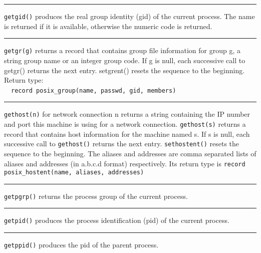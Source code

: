 \bigskip\hrule\vspace{0.1cm}

\noindent
\texttt{getgid()} produces the real group identity (gid) of the current process.
The name is returned if it is available, otherwise the numeric code is
returned.

\bigskip\hrule\vspace{0.1cm}

\noindent
\texttt{getgr(g)} returns a record that contains group file
information for group
g, a string group name or an integer group code. If g is null, each
successive call to getgr() returns the next entry. setgrent() resets
the sequence to the beginning. Return type:\\
\ \ \texttt{record posix\_group(name, passwd, gid, members)}

\bigskip\hrule\vspace{0.1cm}

\noindent
\texttt{gethost(n)} for network connection n returns a string containing
the IP number and port this machine is using for a network connection.
\texttt{gethost(s)} returns a record that contains host information for the
machine named s. If s is null, each successive call to \texttt{gethost()}
returns the next entry. \texttt{sethostent()} resets the sequence to the
beginning. The aliases and addresses are comma separated lists of
aliases and addresses (in a.b.c.d format) respectively. Its return
type is \texttt{record posix\_hostent(name, aliases, addresses)}

\bigskip\hrule\vspace{0.1cm}

\noindent
\texttt{getpgrp()} returns the process group of the current process. 

\bigskip\hrule\vspace{0.1cm}

\noindent
\texttt{getpid()} produces the process identification (pid) of the current
process.

\bigskip\hrule\vspace{0.1cm}

\noindent
\texttt{getppid()} produces the pid of the parent process.

